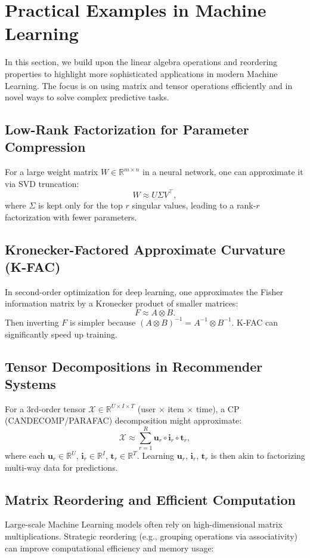 \section{Practical Examples in Machine Learning}

In this section, we build upon the linear algebra operations and reordering properties 
to highlight more sophisticated applications in modern Machine Learning. 
The focus is on using matrix and tensor operations efficiently and in novel ways to 
solve complex predictive tasks.

\subsection{Low-Rank Factorization for Parameter Compression}
For a large weight matrix $W \in \mathbb{R}^{m \times n}$ in a neural network, 
one can approximate it via SVD truncation:
\[
W \approx U \Sigma V^\top,
\]
where $\Sigma$ is kept only for the top $r$ singular values, 
leading to a rank-$r$ factorization with fewer parameters.

\subsection{Kronecker-Factored Approximate Curvature (K-FAC)}
In second-order optimization for deep learning, 
one approximates the Fisher information matrix by a Kronecker product of smaller matrices:
\[
F \approx A \otimes B.
\]
Then inverting $F$ is simpler because $(A \otimes B)^{-1} = A^{-1} \otimes B^{-1}$. 
K-FAC can significantly speed up training.

\subsection{Tensor Decompositions in Recommender Systems}
For a 3rd-order tensor $\mathcal{X} \in \mathbb{R}^{U \times I \times T}$ 
(user \(\times\) item \(\times\) time), 
a CP (CANDECOMP/PARAFAC) decomposition might approximate:
\[
\mathcal{X} \approx \sum_{r=1}^R \mathbf{u}_r \circ \mathbf{i}_r \circ \mathbf{t}_r,
\]
where each $\mathbf{u}_r \in \mathbb{R}^U$, $\mathbf{i}_r \in \mathbb{R}^I$, 
$\mathbf{t}_r \in \mathbb{R}^T$. Learning $\mathbf{u}_r$, $\mathbf{i}_r$, $\mathbf{t}_r$ 
is then akin to factorizing multi-way data for predictions.

\subsection{Matrix Reordering and Efficient Computation}
Large-scale Machine Learning models often rely on high-dimensional matrix multiplications. 
Strategic reordering (e.g., grouping operations via associativity) can improve computational 
efficiency and memory usage:

